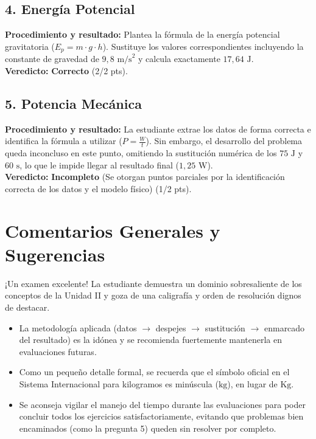 \documentclass[12pt,letterpaper]{article}
\begin{document}
\subsection*{4. Energía Potencial}
\textbf{Procedimiento y resultado:} Plantea la fórmula de la energía potencial gravitatoria ($E_p = m \cdot g \cdot h$). Sustituye los valores correspondientes incluyendo la constante de gravedad de $9,8 \text{ m/s}^2$ y calcula exactamente $17,64 \text{ J}$. \\
\textbf{Veredicto:} \textbf{Correcto} (2/2 pts).

\subsection*{5. Potencia Mecánica}
\textbf{Procedimiento y resultado:} La estudiante extrae los datos de forma correcta e identifica la fórmula a utilizar ($P = \frac{W}{t}$). Sin embargo, el desarrollo del problema queda inconcluso en este punto, omitiendo la sustitución numérica de los $75 \text{ J}$ y $60 \text{ s}$, lo que le impide llegar al resultado final ($1,25 \text{ W}$). \\
\textbf{Veredicto:} \textbf{Incompleto} (Se otorgan puntos parciales por la identificación correcta de los datos y el modelo físico) (1/2 pts).

\vspace{0.5cm}
\section*{Comentarios Generales y Sugerencias}
¡Un examen excelente! La estudiante demuestra un dominio sobresaliente de los conceptos de la Unidad II y goza de una caligrafía y orden de resolución dignos de destacar.
\begin{itemize}
    \item La metodología aplicada (datos $\rightarrow$ despejes $\rightarrow$ sustitución $\rightarrow$ enmarcado del resultado) es la idónea y se recomienda fuertemente mantenerla en evaluaciones futuras.
    \item Como un pequeño detalle formal, se recuerda que el símbolo oficial en el Sistema Internacional para kilogramos es minúscula ($\text{kg}$), en lugar de $\text{Kg}$.
    \item Se aconseja vigilar el manejo del tiempo durante las evaluaciones para poder concluir todos los ejercicios satisfactoriamente, evitando que problemas bien encaminados (como la pregunta 5) queden sin resolver por completo.
\end{itemize}
\end{document}
